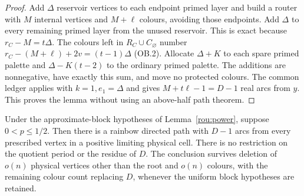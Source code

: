 \begin{proof}
Add $\Delta$ reservoir vertices to each endpoint primed layer and build a router with $M$ internal vertices and $M+\ell$ colours, avoiding those endpoints. Add $\Delta$ to every remaining primed layer from the unused reservoir. This is exact because $r_C-M=t\Delta$. The colours left in $R_C\cup{}C_\varnothing$ number $r_C-(M+\ell)+2v=(t-1)\Delta$ \textup{(OB.2)}. Allocate $\Delta+K$ to each spare primed palette and $\Delta-K(t-2)$ to the ordinary primed palette. The additions are nonnegative, have exactly this sum, and move no protected colours.
The common ledger applies with $k=1,e_1=\Delta$ and gives $M+t\ell-1=D-1$ real arcs from $y$. This proves the lemma without using an above-half path theorem.
\end{proof}

\begin{theorem}
\label{gaq:completion}\label{aq:completion}
Under the approximate-block hypotheses of Lemma~\ref{rou:power},
suppose $0<p\le1/2$. Then there is a rainbow directed path with $D-1$ arcs from every prescribed vertex in a positive limiting physical cell. There is no restriction on the quotient period or
the residue of $D$. The conclusion survives deletion of $o(n)$ physical vertices other than the root and $o(n)$ colours, with the remaining colour count replacing $D$, whenever the uniform block hypotheses are retained.
\end{theorem}
